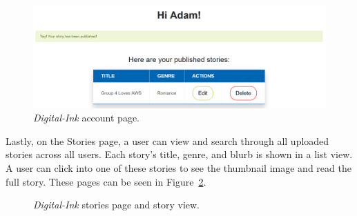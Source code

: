 \begin{figure}[!htbp]
    \centering
    \includegraphics[width=150mm]{resources/webapp/digital-ink-account}
    \caption{\textit{Digital-Ink} account page.}
    \label{fig:digital-ink-account}
\end{figure}

Lastly, on the Stories page, a user can view and search through all uploaded stories across all users.
Each story's title, genre, and blurb is shown in a list view.
A user can click into one of these stories to see the thumbnail image and read the full story.
These pages can be seen in Figure~\ref{fig:digital-ink-stories-and-story}.

\begin{figure}[!htbp]
    \centering
    \hfill
    \caption{\textit{Digital-Ink} stories page and story view.}
    \label{fig:digital-ink-stories-and-story}
\end{figure}
